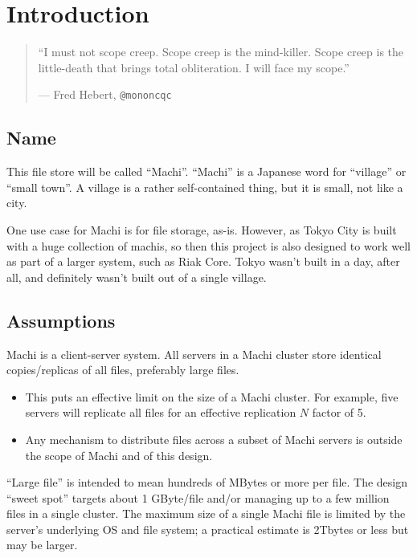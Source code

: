 \documentclass[preprint,10pt]{sigplanconf}
\begin{document}
\section{Introduction}
\label{sec:introduction}

\begin{quotation}
``I must not scope creep. Scope creep is the mind-killer. Scope creep
  is the little-death that brings total obliteration. I will face my
  scope.''
\par 
\hfill{--- Fred Hebert, {\tt @mononcqc}}
\end{quotation}
\subsection{Name}
\label{sub:name}

This file store will be called ``Machi''.
``Machi'' is a Japanese word for
``village'' or ``small town''.  A village is a rather self-contained
thing, but it is small, not like a city.

One use case for Machi is for file storage, as-is.  However, as Tokyo
City is built with a huge collection of machis, so then this project
is also designed to work well as part of a larger system, such as Riak
Core.  Tokyo wasn't built in a day, after all, and definitely wasn't
built out of a single village.

\subsection{Assumptions}
\label{sub:assumptions}

Machi is a client-server system.  All servers in a Machi cluster store
identical copies/replicas of all files, preferably large files.
\begin{itemize}
    \item This puts an effective limit on the size of a Machi cluster.
      For example, five servers will replicate all files
      for an effective replication $N$ factor of 5.
    \item Any mechanism to distribute files across a subset of Machi
      servers is outside the scope of Machi and of this design.
\end{itemize}

``Large file'' is intended to mean hundreds of MBytes or more
per file.  The design ``sweet spot'' targets about
1 GByte/file and/or managing up to a few million files in a
single cluster.  The maximum size of a single Machi file is
limited by the server's underlying OS and file system; a
practical estimate is 2Tbytes or less but may be larger.
\end{document}
